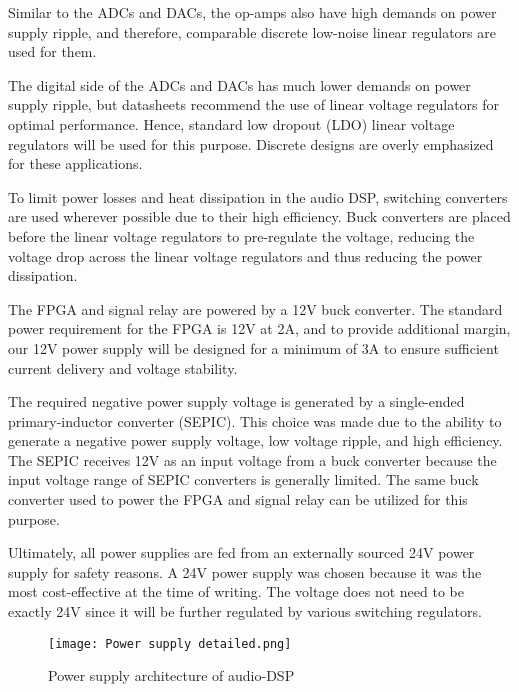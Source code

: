 Similar to the ADCs and DACs, the op-amps also have high demands on power supply ripple, and therefore, comparable discrete low-noise linear regulators are used for them.

The digital side of the ADCs and DACs has much lower demands on power supply ripple, but datasheets recommend the use of linear voltage regulators for optimal performance. Hence, standard low dropout (LDO) linear voltage regulators will be used for this purpose. Discrete designs are overly emphasized for these applications.

To limit power losses and heat dissipation in the audio DSP, switching converters are used wherever possible due to their high efficiency. Buck converters are placed before the linear voltage regulators to pre-regulate the voltage, reducing the voltage drop across the linear voltage regulators and thus reducing the power dissipation.

The FPGA and signal relay are powered by a 12V buck converter. The standard power requirement for the FPGA is 12V at 2A, and to provide additional margin, our 12V power supply will be designed for a minimum of 3A to ensure sufficient current delivery and voltage stability.

The required negative power supply voltage is generated by a single-ended primary-inductor converter (SEPIC). This choice was made due to the ability to generate a negative power supply voltage, low voltage ripple, and high efficiency. The SEPIC receives 12V as an input voltage from a buck converter because the input voltage range of SEPIC converters is generally limited. The same buck converter used to power the FPGA and signal relay can be utilized for this purpose.

Ultimately, all power supplies are fed from an externally sourced 24V power supply for safety reasons. A 24V power supply was chosen because it was the most cost-effective at the time of writing. The voltage does not need to be exactly 24V since it will be further regulated by various switching regulators.

\newpage

\begin{figure}[!h]
    \texttt{[image: Power supply detailed.png]}\\    
    \caption{Power supply architecture of audio-DSP}
    \label{fig:arch-power-supply}
\end{figure}

\par
